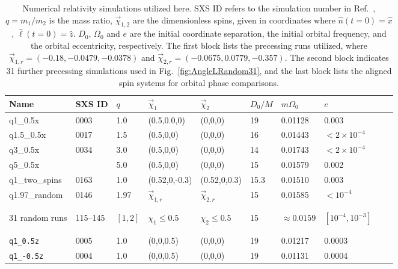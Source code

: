 \documentclass[aps,prd,amsmath,floatfix,twocolumn,superscriptaddress,nofootinbib,showpacs]{revtex4-1}
\newcommand{\ellHat}{\ensuremath{\hat{\ell}}}
\newcommand{\nHat}{\ensuremath{\hat{n}}}
\begin{document}
\begin{table*}
  \caption{  \label{tbl:Parameters}Numerical
    relativity simulations utilized here.  SXS ID refers to the
    simulation number in Ref.~\cite{PhysRevLett.111.241104}, $q=m_1/m_2$ is the mass ratio,
    $\vec{\chi}_{1,2}$ are the dimensionless spins, given in
    coordinates where $\nHat(t=0) = \hat{x}$,
    $\ellHat(t=0)=\hat{z}$. $D_{0}$, $\Omega_{0}$ and $e$ are the initial
    coordinate separation, the initial orbital
    frequency, and the orbital eccentricity, respectively.
    The first block  lists the precessing runs utilized, where
    $\vec{\chi}_{1,r}=(-0.18,-0.0479,-0.0378)$ and $\vec{\chi}_{2,r}=
    (-0.0675,0.0779,-0.357)$. 
    The second block indicates 31 further precessing simulations used
    in Fig.~\ref{fig:AngleLRandom31}, and the last block lists the
    aligned spin systems for  orbital phase comparisons.  
  }
  \begin{ruledtabular}
  \begin{tabular}{@{}llllllllll@{}}
     Name &  SXS ID  & $q$ & $\vec{\chi}_{1}$ &
    $\vec{\chi}_{2}$ & $D_{0}/M$ & $m\Omega_{0}$ & $e$ \\
    \hline
    q1\_0.5x &  0003   & 1.0 & (0.5,0.0,0) & (0,0,0) & 19 &
    0.01128 &  0.003 \\
    q1.5\_0.5x & 0017  & 1.5 & (0.5,0,0) & (0,0,0) & 16 &
    0.01443 & $<2\times10^{-4}$ \\
    q3\_0.5x & 0034  & 3.0 & (0.5,0,0) & (0,0,0)  & 14 &
    0.01743 & $<2\times10^{-4}$ \\
    q5\_0.5x &    & 5.0 & (0.5,0,0) & (0,0,0) & 15 &
    0.01579 &  0.002  \\
    q1\_two\_spins & 0163   & 1.0 & (0.52,0,-0.3) & (0.52,0,0.3)
    & 15.3 & 0.01510 & 0.003 \\
    q1.97\_random  & 0146    & 1.97
      & $\vec{\chi}_{1,r}$
      & $\vec{\chi}_{2,r}$
      & 15 & 0.01585 & $<10^{-4}$  \\ 
\\[-0.95em]
\hline
\\[-.95em]
31 random runs & 115--145 & $[1,2]$ & $\chi_1\le 0.5$ & $\chi_2\le 0.5$ & 
15 & $\approx 0.0159$ &  $[10^{-4}, 10^{-3}]$ \\ 
\\[-0.95em]
\hline\\[-.95em]
    \verb|q1_0.5z| & 0005  & 1.0 & (0,0,0.5) & (0,0,0) & 19 &
    0.01217 & 0.0003\\
    \verb|q1_-0.5z| & 0004 & 1.0 & (0,0,0.5) & (0,0,0)  & 19 &
    0.01131 & 0.0004\\

\end{tabular}
\end{ruledtabular}
\end{table*}
\end{document}

